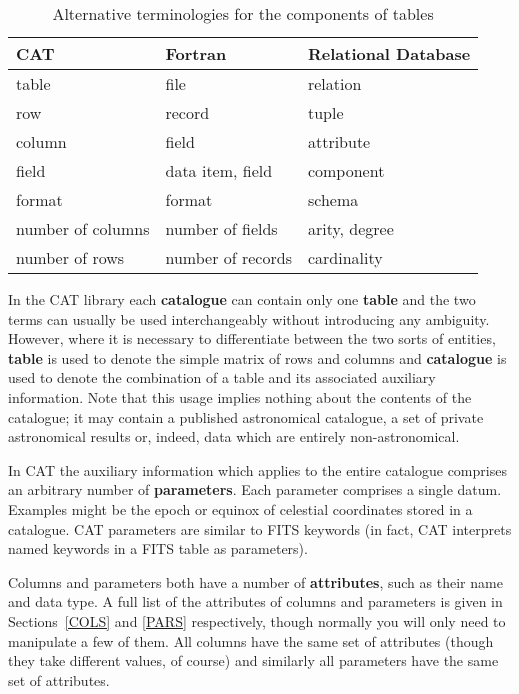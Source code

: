 \begin{table}[htbp]

\begin{center}
\begin{tabular}{lll}
CAT               &  Fortran           &  Relational Database \\ \hline
table             &  file              &  relation      \\
row               &  record            &  tuple         \\
column            &  field             &  attribute     \\
field             &  data item, field  &  component     \\
format            &  format            &  schema        \\
number of columns &  number of fields  &  arity, degree \\
number of rows    &  number of records &  cardinality   \\
\end{tabular}
\end{center}

\caption{\label{TABLE_NOT}Alternative terminologies for the components of
tables}

\end{table}

In the CAT library each {\bf catalogue} can contain only one {\bf
table} and the two terms can usually be used interchangeably without
introducing any ambiguity. However, where it is necessary to
differentiate between the two sorts of entities, {\bf table} is used
to denote the simple matrix of rows and columns and {\bf catalogue} is
used to denote the combination of a table and its associated auxiliary
information. Note that this usage implies nothing about the contents
of the catalogue; it may contain a published astronomical catalogue, a 
set of private astronomical results or, indeed, data which are entirely 
non-astronomical.

In CAT the auxiliary information which applies to the entire catalogue
comprises an arbitrary number of {\bf parameters}. Each parameter
comprises a single datum. Examples might be the epoch or equinox of
celestial coordinates stored in a catalogue. CAT parameters are
similar to FITS keywords (in fact, CAT interprets named keywords in
a FITS table as parameters).

Columns and parameters both have a number of {\bf attributes}, such
as their name and data type. A full list of the attributes of
columns and parameters is given in Sections~\ref{COLS} and
\ref{PARS} respectively, though normally you will only need to 
manipulate a few of them.  All columns have the same set of attributes 
(though they take different values, of course) and similarly all 
parameters have the same set of attributes.

